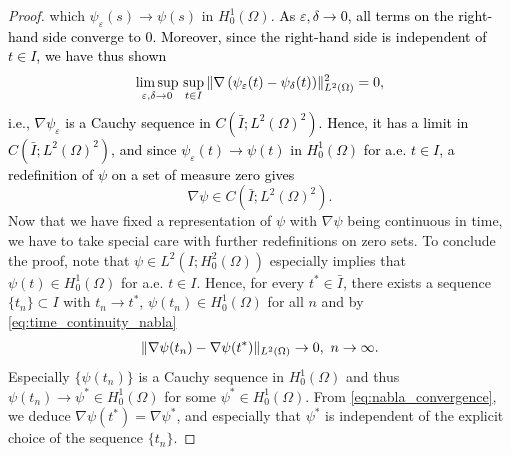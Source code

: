 \documentclass{m2an}
\newcommand{\1}{\mathds{1}}
\newcommand{\Om}{\Omega}
\newcommand{\revB}[1]{\textcolor{black}{#1}}
\DeclarePairedDelimiter{\norm}{\lVert}{\rVert}
\theoremstyle{definition}
\begin{document}
\begin{proof}
    which $\psi_\varepsilon(s) \to \psi(s)$ in $H^1_0(\Om)$. 
    \revB{As $\varepsilon, \delta \to 0$, all terms on the right-hand side converge to $0$.
        Moreover, since the right-hand side is independent of $t \in I$, we have thus shown
    \begin{equation*}
        \limsup_{\varepsilon,\delta \to 0} \, \sup_{t \in I} \, 
        \norm{\nabla \left(\psi_\varepsilon(t) - \psi_\delta(t)\right)}_{L^2(\Om)}^2 = 0,
    \end{equation*}
    i.e., $\nabla \psi_\varepsilon$ is a Cauchy sequence in $C(\bar I;L^2(\Om)^2)$.
    Hence, it has a limit in $C(\bar I;L^2(\Om)^2)$, and since $\psi_\varepsilon(t) \to \psi(t)$ in $H^1_0(\Om)$
    for a.e. $t \in I$, a redefinition of $\psi$ on a set of measure zero gives
    }
    \begin{equation}\label{eq:time_continuity_nabla}
        \nabla \psi \in C(\bar I;L^2(\Om)^2).
    \end{equation}
    Now that we have fixed a representation of $\psi$ with $\nabla \psi$ being continuous in time, we have 
    to take special care with further redefinitions on zero sets.
    To conclude the proof, note that $\psi \in L^2(I;H^2_0(\Om))$ especially implies that 
    $\psi(t) \in H^1_0(\Om)$ for a.e. $t \in I$. Hence, for every $t^* \in \bar I$, there exists a sequence 
    $\{t_n\} \subset I$ with $t_n \to t^*$, $\psi(t_n) \in H^1_0(\Om)$ for all $n$ and by 
    \eqref{eq:time_continuity_nabla}
    \begin{equation}\label{eq:nabla_convergence}
     \norm{\nabla \psi(t_n) - \nabla \psi(t^*)}_{L^2(\Om)} \to 0, \ n\to \infty.
    \end{equation}
    Especially $\{\psi(t_n)\}$ is a Cauchy sequence in $H^1_0(\Om)$ and thus 
    $\psi(t_n) \to \psi^* \in H^1_0(\Om)$ for some $\psi^* \in H^1_0(\Om)$.
    From \eqref{eq:nabla_convergence}, we deduce $\nabla \psi(t^*) = \nabla \psi^*$, and especially
    that $\psi^*$ is independent of the explicit choice of the sequence $\{t_n\}$.

\end{proof}
\end{document}
